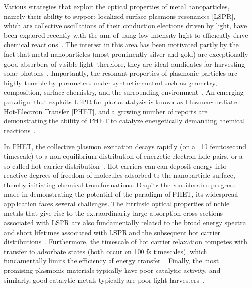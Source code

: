 \documentclass[journal=jpclcd,manuscript=article]{achemso}
\begin{document}
Various strategies that exploit the optical properties of metal nanoparticles, namely their ability to support localized surface plasmons resonances [LSPR], 
which are collective oscillations of their 
conduction electrons driven by light, have been explored recently with the aim of using low-intensity light to efficiently drive chemical 
reactions~\cite{LCI_NatureMater_2011,KAC_ACSCatalysis_2013,ZLQ_RSCAdvances_2015,PKL_AccChemRes_2015}.  The interest in this area has 
been motivated partly by the fact that metal nanoparticles (most prominently silver and gold) are exceptionally good absorbers of visible light; therefore,
they are ideal candidates for harvesting solar photons~\cite{AP_NatMat_2010}.  
Importantly, the resonant properties of plasmonic particles are highly tunable by parameters under synthetic control such as geometry, composition, surface chemistry, and the surrounding 
environment~\cite{SX_Science_2002,BCN_ChemRev_2005,GB_NatPhoton_2010}.  An emerging paradigm that exploits LSPR for photocatalysis is known as Plasmon-mediated Hot-Electron Transfer [PHET],
and a growing number of reports are demonstrating the ability of PHET to catalyze energetically demanding chemical 
reactions~\cite{CXL_NatureChem_2011,MZL_Science_2013,MLL_NanoLett_2013,LFP_AC_2015,ZHX_NatPhoton_2016,ZJM_ACSNano_2016,SZZ_PNAS_2016,SCR_JPCC_2016}.

In PHET, the collective plasmon excitation decays rapidly (on a ~10 femtosecond timescale) to a non-equilibrium distribution of energetic electron-hole pairs, or a so-called hot carrier 
distribution~\cite{KAC_ACSCatalysis_2013,GZG_JPCC_2013,SNJ_NatComm_2014,WCM_Science_2015,MWW_NatComm_2015, BSN_ACSNano_2016}.  
Hot carriers can can deposit energy into reactive degrees of freedom of molecules adsorbed to the nanoparticle surface, thereby initiating chemical transformations.  Despite the considerable progress made in 
demonstrating the potential of the paradigm of PHET, its widespread application faces several challenges. The intrinsic optical properties of noble metals that give rise to the extraordinarily 
large absorption cross sections associated with LSPR are also fundamentally related to the broad energy spectra and short lifetimes associated with LSPR and the subsequent hot carrier 
distributions~\cite{KS_JCP_1983}. 
Furthermore, the timescale of hot carrier relaxation competes 
with transfer to adsorbate states (both occur on 100 fs timescales), which fundamentally limits the efficiency of energy transfer~\cite{WCM_Science_2015}.  Finally, the most promising plasmonic materials typically have poor catalytic activity, and similarly,
good catalytic metals typically are poor light harvesters~\cite{SZZ_PNAS_2016}.
\end{document}
